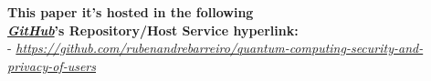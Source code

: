 \documentclass[conference]{IEEEtran}
\begin{document}
\vspace{4pt}

\begin{center}
    \small{
        \textbf{
            This paper it's hosted in the following \\ \href{https://github.com/}{\textit{GitHub}}'s Repository/Host Service hyperlink:
        }\\
        \vspace{3pt}
        - \href{https://github.com/rubenandrebarreiro/quantum-computing-security-and-privacy-of-users}{\textit{https://github.com/rubenandrebarreiro/quantum-computing-security-and-privacy-of-users}}
    }
\end{center}
\end{document}
